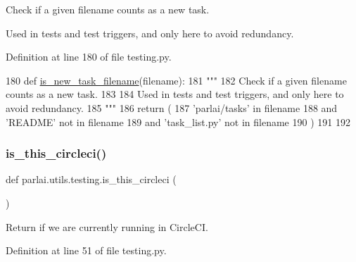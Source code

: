 \begin{DoxyVerb}Check if a given filename counts as a new task.

Used in tests and test triggers, and only here to avoid redundancy.
\end{DoxyVerb}
 

Definition at line 180 of file testing.\+py.


\begin{DoxyCode}
180 \textcolor{keyword}{def }\hyperlink{namespaceparlai_1_1utils_1_1testing_a18092382f94848a52ef19248aa39f7ca}{is\_new\_task\_filename}(filename):
181     \textcolor{stringliteral}{"""}
182 \textcolor{stringliteral}{    Check if a given filename counts as a new task.}
183 \textcolor{stringliteral}{}
184 \textcolor{stringliteral}{    Used in tests and test triggers, and only here to avoid redundancy.}
185 \textcolor{stringliteral}{    """}
186     \textcolor{keywordflow}{return} (
187         \textcolor{stringliteral}{'parlai/tasks'} \textcolor{keywordflow}{in} filename
188         \textcolor{keywordflow}{and} \textcolor{stringliteral}{'README'} \textcolor{keywordflow}{not} \textcolor{keywordflow}{in} filename
189         \textcolor{keywordflow}{and} \textcolor{stringliteral}{'task\_list.py'} \textcolor{keywordflow}{not} \textcolor{keywordflow}{in} filename
190     )
191 
192 
\end{DoxyCode}
\mbox{\label{namespaceparlai_1_1utils_1_1testing_a2b1aba8cb2afc498691840f4b8999420}} 
\subsubsection{\texorpdfstring{is\+\_\+this\+\_\+circleci()}{is\_this\_circleci()}}
{\footnotesize\ttfamily def parlai.\+utils.\+testing.\+is\+\_\+this\+\_\+circleci (\begin{DoxyParamCaption}{ }\end{DoxyParamCaption})}

\begin{DoxyVerb}Return if we are currently running in CircleCI.
\end{DoxyVerb}
 

Definition at line 51 of file testing.\+py.


